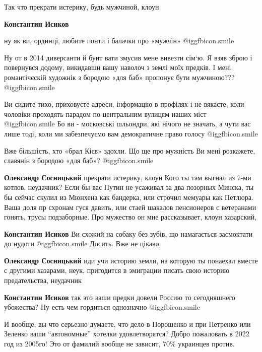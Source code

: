 \begin{itemize}
\begin{itemize}
Так что прекрати истерику, будь мужчиной, клоун

\textbf{Константин Исиков} 

ну як ви, ординці, любите понти і балачки про «мужчін»  @igg{fbicon.smile} 

Ну от в 2014 диверсанти й бунт вати змусив мене вивезти сім‘ю. Я взяв зброю і
повернувся додому, викидавши вашу наволоч з землі моїх предків. І мені
романтічєскій художнік з бородою «для баб» пропонує бути мужчиною???  @igg{fbicon.smile} 

Ви сидите тихо, приховуєте адреси, інформацію в профілях і не вякаєте, коли
чоловіки проходять парадом по центральним вулицям наших міст  @igg{fbicon.smile}  Бо ви -
московські шльондри, які нічого не значать, а чути вас лише тоді, коли ми
забезпечуємо вам демократичне право голосу  @igg{fbicon.smile} 

Вже більшість, хто «брал Кієв» здохли. Що ще про мужність Ви мені розкажете,
славянін з бородою «для баб»?  @igg{fbicon.smile} 


\textbf{Олександр Сосницький} прекрати истерику, клоун
Кого ты там выгнал из 7-ми котлов, неудачник?
Если бы вас Путин не усаживал за два позорных Минска, ты бы сейчас скулил из Мюнхена как бандерка, или строчил мемуары как Петлюра.
Ваша доля пр схронам гуся давить, или стаей шакалов пенсионеров с ветеранами гонять, трусы подзаборные.
Про мужество он мне рассказывает, клоун хазарский,

\textbf{Константин Исиков} Ви схожий на собаку без зубів, що намагається засмоктати до нудоти  @igg{fbicon.smile} 
Досить. Вже не цікаво.

\textbf{Олександр Сосницький} иди учи историю земли, на которую ты понаехал вместе с другими хазарами, неук, пригодится в эмиграции писать свою историю предательства, неудачник

\textbf{Константин Исиков} так это ваши предки довели Россию то сегодняшнего убожества? Ну есть чем гордиться однозначно  @igg{fbicon.smile} 


\end{itemize} %


И вообще, вы что серьезно думаете, что дело в Порошенко и при Петренко или
Зеленко ваши \enquote{автономные} хотелки удовлетворятся? Добро пожаловать в 2022 год
из 2005го! Это от фамилий вообще не зависит, 70\% украинцев против.



\end{itemize}
